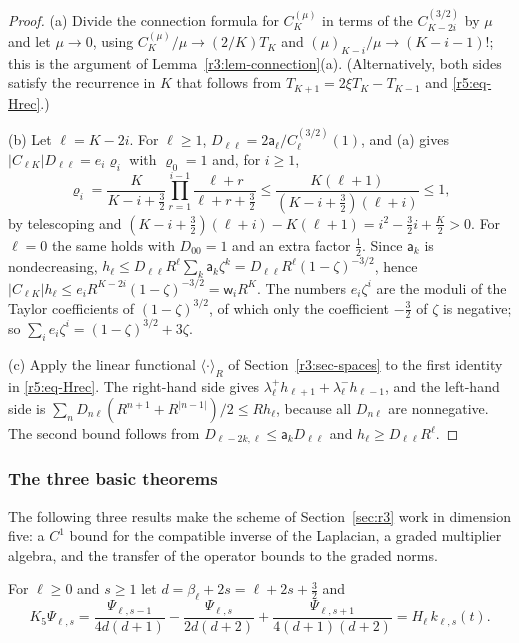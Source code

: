\documentclass[11pt]{amsart}
\theoremstyle{definition}
\theoremstyle{remark}
\numberwithin{equation}{section}
\begin{document}
\begin{proof}
(a) Divide the connection formula \cite[18.18.16]{DLMF} for $C^{(\mu)}_K$ in terms of the $C^{(3/2)}_{K-2i}$ by $\mu$ and let $\mu\to0$, using $C^{(\mu)}_K/\mu\to(2/K)T_K$ \cite[18.7.25]{DLMF} and $(\mu)_{K-i}/\mu\to(K-i-1)!$; this is the argument of Lemma~\ref{r3:lem-connection}(a). (Alternatively, both sides satisfy the recurrence in $K$ that follows from $T_{K+1}=2\xi T_K-T_{K-1}$ and \eqref{r5:eq-Hrec}.)

(b) Let $\ell=K-2i$. For $\ell\geq1$, $D_{\ell\ell}=2\mathsf a_\ell/C^{(3/2)}_\ell(1)$, and (a) gives $|C_{\ell K}|D_{\ell\ell}=e_i\varrho_i$ with $\varrho_0=1$ and, for $i\geq1$,
\[
\varrho_i=\frac K{K-i+\frac32}\prod_{r=1}^{i-1}\frac{\ell+r}{\ell+r+\frac32}\leq\frac{K(\ell+1)}{(K-i+\frac32)(\ell+i)}\leq1,
\]
by telescoping and $(K-i+\frac32)(\ell+i)-K(\ell+1)=i^2-\frac32i+\frac K2>0$. For $\ell=0$ the same holds with $D_{00}=1$ and an extra factor $\frac12$. Since $\mathsf a_k$ is nondecreasing, $h_\ell\leq D_{\ell\ell}R^\ell\sum_k\mathsf a_k\zeta^k=D_{\ell\ell}R^\ell(1-\zeta)^{-3/2}$, hence $|C_{\ell K}|h_\ell\leq e_iR^{K-2i}(1-\zeta)^{-3/2}=\mathsf w_iR^K$. The numbers $e_i\zeta^i$ are the moduli of the Taylor coefficients of $(1-\zeta)^{3/2}$, of which only the coefficient $-\frac32$ of $\zeta$ is negative; so $\sum_ie_i\zeta^i=(1-\zeta)^{3/2}+3\zeta$.

(c) Apply the linear functional $\langle\cdot\rangle_R$ of Section~\ref{r3:sec-spaces} to the first identity in \eqref{r5:eq-Hrec}. The right-hand side gives $\lambda^+_\ell h_{\ell+1}+\lambda^-_\ell h_{\ell-1}$, and the left-hand side is $\sum_nD_{n\ell}(R^{n+1}+R^{|n-1|})/2\leq Rh_\ell$, because all $D_{n\ell}$ are nonnegative. The second bound follows from $D_{\ell-2k,\ell}\leq\mathsf a_kD_{\ell\ell}$ and $h_\ell\geq D_{\ell\ell}R^\ell$.
\end{proof}

\subsubsection*{The three basic theorems}
The following three results make the scheme of Section~\ref{sec:r3} work in dimension five: a $C^1$ bound for the compatible inverse of the Laplacian, a graded multiplier algebra, and the transfer of the operator bounds to the graded norms.

For $\ell\geq0$ and $s\geq1$ let $d=\beta_\ell+2s=\ell+2s+\frac32$ and
\begin{equation}\label{r5:eq-K}
K_5\Psi_{\ell,s}=\frac{\Psi_{\ell,s-1}}{4d(d+1)}-\frac{\Psi_{\ell,s}}{2d(d+2)}+\frac{\Psi_{\ell,s+1}}{4(d+1)(d+2)}=H_\ell\,k_{\ell,s}(t).
\end{equation}
\end{document}
